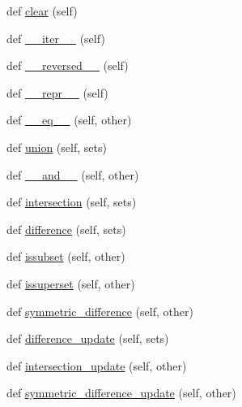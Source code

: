 \begin{DoxyCompactItemize}
\item 
def \hyperlink{classsetuptools_1_1__vendor_1_1ordered__set_1_1OrderedSet_a8b928f1bac1c68eedf2efac951d28d51}{clear} (self)
\item 
def \hyperlink{classsetuptools_1_1__vendor_1_1ordered__set_1_1OrderedSet_a3238ae7179a07f6e984b517f9ea91b33}{\+\_\+\+\_\+iter\+\_\+\+\_\+} (self)
\item 
def \hyperlink{classsetuptools_1_1__vendor_1_1ordered__set_1_1OrderedSet_ac65bb1aa0efb9abd266b9b3b5befb95d}{\+\_\+\+\_\+reversed\+\_\+\+\_\+} (self)
\item 
def \hyperlink{classsetuptools_1_1__vendor_1_1ordered__set_1_1OrderedSet_ae60d1296337c25b0755bfc5b271573ce}{\+\_\+\+\_\+repr\+\_\+\+\_\+} (self)
\item 
def \hyperlink{classsetuptools_1_1__vendor_1_1ordered__set_1_1OrderedSet_a659f21309131e5f217ae8b0ac5f834ad}{\+\_\+\+\_\+eq\+\_\+\+\_\+} (self, other)
\item 
def \hyperlink{classsetuptools_1_1__vendor_1_1ordered__set_1_1OrderedSet_adb947c911269a4f7fb76f4eeea2efa6e}{union} (self, sets)
\item 
def \hyperlink{classsetuptools_1_1__vendor_1_1ordered__set_1_1OrderedSet_ae68845d6aadc91869c5552ea89bf39f1}{\+\_\+\+\_\+and\+\_\+\+\_\+} (self, other)
\item 
def \hyperlink{classsetuptools_1_1__vendor_1_1ordered__set_1_1OrderedSet_a6572a9eed50439e53c6ec552276099e6}{intersection} (self, sets)
\item 
def \hyperlink{classsetuptools_1_1__vendor_1_1ordered__set_1_1OrderedSet_a02281d7fc2351104ab20d53aa827fa38}{difference} (self, sets)
\item 
def \hyperlink{classsetuptools_1_1__vendor_1_1ordered__set_1_1OrderedSet_a8f65dc04159e7de8741fb31edf71956d}{issubset} (self, other)
\item 
def \hyperlink{classsetuptools_1_1__vendor_1_1ordered__set_1_1OrderedSet_a94aaf3157a0f86ffa965571f21b13147}{issuperset} (self, other)
\item 
def \hyperlink{classsetuptools_1_1__vendor_1_1ordered__set_1_1OrderedSet_a3cb605fe96c3dd88b27099de9ac919d4}{symmetric\+\_\+difference} (self, other)
\item 
def \hyperlink{classsetuptools_1_1__vendor_1_1ordered__set_1_1OrderedSet_ae489e12fb9d24f6a1c01c298837e6fe3}{difference\+\_\+update} (self, sets)
\item 
def \hyperlink{classsetuptools_1_1__vendor_1_1ordered__set_1_1OrderedSet_aa74cb4ee0ea35a15b0e0db2f88d8b79d}{intersection\+\_\+update} (self, other)
\item 
def \hyperlink{classsetuptools_1_1__vendor_1_1ordered__set_1_1OrderedSet_a52a023f956d56fc4cead0069a91e4e1a}{symmetric\+\_\+difference\+\_\+update} (self, other)
\end{DoxyCompactItemize}
